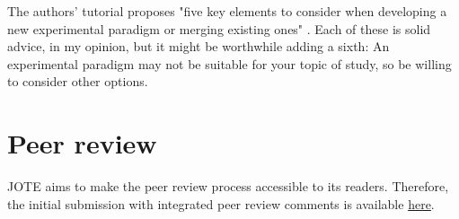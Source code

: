 \documentclass[twocolumn, serif, authordate, reflection]{jote-article}
\begin{document}
The authors' tutorial proposes "five key elements to consider when developing a new experimental paradigm or merging existing ones" \parencite[p.35]{Traxler2020}. Each of these is solid advice, in my opinion, but it might be worthwhile adding a sixth: An experimental paradigm may not be suitable for your topic of study, so be willing to consider other options.

{}
\section*{Peer review} 

JOTE aims to make the peer review process accessible to its readers. Therefore, the initial submission with integrated peer review comments is available \href{https://doi.org/10.36850/r2.pr1}{here}.








\setlength{\bibhang}{\parindent}

 {} 
\printbibliography
\end{document}
